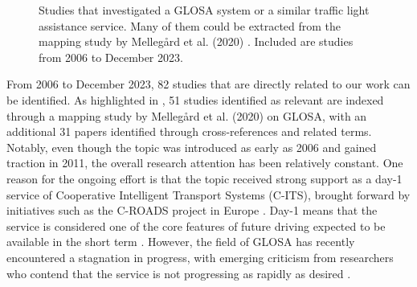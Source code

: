 \begin{figure}[t]
\centering
{}
\caption{Studies that investigated a GLOSA system or a similar traffic light assistance service. Many of them could be extracted from the mapping study by Mellegård et al. (2020) \cite{mellegard_day_2020}. Included are studies from 2006 to December 2023.}
\label{fig:related-work-research-method}
\end{figure}

From 2006 to December 2023, 82 studies that are directly related to our work can be identified. As highlighted in , 51 studies identified as relevant are indexed through a mapping study by Mellegård et al. (2020) \cite{mellegard_day_2020} on GLOSA, with an additional 31 papers identified through cross-references and related terms. Notably, even though the topic was introduced as early as 2006 and gained traction in 2011, the overall research attention has been relatively constant. One reason for the ongoing effort is that the topic received strong support as a day-1 service of Cooperative Intelligent Transport Systems (C-ITS), brought forward by initiatives such as the C-ROADS project in Europe \cite{sharara_impact_2019}. Day-1 means that the service is considered one of the core features of future driving expected to be available in the short term \cite{mellegard_day_2020}. However, the field of GLOSA has recently encountered a stagnation in progress, with emerging criticism from researchers who contend that the service is not progressing as rapidly as desired \cite{mellegard_day_2020, otto_framework_2023}.

